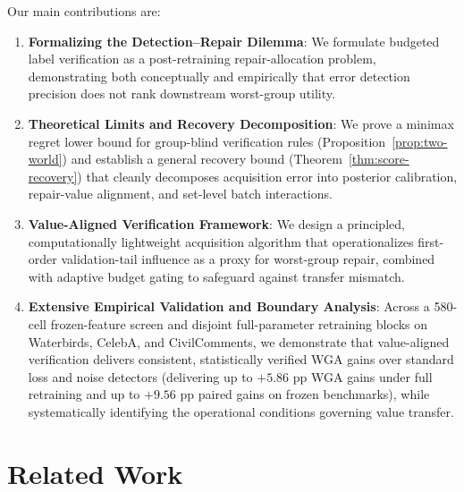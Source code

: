 \documentclass{article}
\begin{document}
Our main contributions are:
\begin{enumerate}[leftmargin=1.3em,topsep=1pt,itemsep=0.5pt,parsep=0pt]
  \item \textbf{Formalizing the Detection--Repair Dilemma}: We formulate budgeted label verification as a post-retraining repair-allocation problem, demonstrating both conceptually and empirically that error detection precision does not rank downstream worst-group utility.
  \item \textbf{Theoretical Limits and Recovery Decomposition}: We prove a minimax regret lower bound for group-blind verification rules (Proposition~\ref{prop:two-world}) and establish a general recovery bound (Theorem~\ref{thm:score-recovery}) that cleanly decomposes acquisition error into posterior calibration, repair-value alignment, and set-level batch interactions.
  \item \textbf{Value-Aligned Verification Framework}: We design a principled, computationally lightweight acquisition algorithm that operationalizes first-order validation-tail influence as a proxy for worst-group repair, combined with adaptive budget gating to safeguard against transfer mismatch.
  \item \textbf{Extensive Empirical Validation and Boundary Analysis}: Across a 580-cell frozen-feature screen and disjoint full-parameter retraining blocks on Waterbirds, CelebA, and CivilComments, we demonstrate that value-aligned verification delivers consistent, statistically verified WGA gains over standard loss and noise detectors (delivering up to $+5.86$ pp WGA gains under full retraining and up to $+9.56$ pp paired gains on frozen benchmarks), while systematically identifying the operational conditions governing value transfer.
\end{enumerate}

\section{Related Work}
\label{sec:related}
\end{document}
